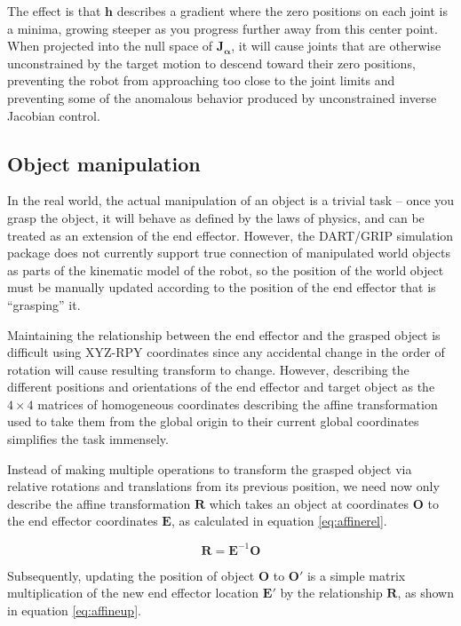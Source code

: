 \documentclass[10pt, conference]{IEEEtran}
\begin{document}
    The effect is that \(\mathbf{h}\) describes a gradient where the
    zero positions on each joint is a minima, growing steeper as you
    progress further away from this center point. When projected into
    the null space of \(\mathbf{J_\alpha}\), it will cause joints that
    are otherwise unconstrained by the target motion to descend toward
    their zero positions, preventing the robot from approaching too
    close to the joint limits and preventing some of the anomalous
    behavior produced by unconstrained inverse Jacobian control.
\subsection{Object manipulation}
\label{sec-3-5}

   In the real world, the actual manipulation of an object is a trivial
   task -- once you grasp the object, it will behave as defined by the
   laws of physics, and can be treated as an extension of the end
   effector. However, the DART/GRIP simulation package does not
   currently support true connection of manipulated world objects as
   parts of the kinematic model of the robot, so the position of the
   world object must be manually updated according to the position of
   the end effector that is ``grasping'' it.

   Maintaining the relationship between the end effector and the grasped
   object is difficult using XYZ-RPY coordinates since any accidental
   change in the order of rotation will cause resulting transform to
   change. However, describing the different positions and orientations
   of the end effector and target object as the \(4 \times 4\) matrices
   of homogeneous coordinates describing the affine transformation used
   to take them from the global origin to their current global
   coordinates simplifies the task immensely.

   Instead of making multiple operations to transform the grasped object
   via relative rotations and translations from its previous position,
   we need now only describe the affine transformation \(\mathbf{R}\)
   which takes an object at coordinates \(\mathbf{O}\) to the end
   effector coordinates \(\mathbf{E}\), as calculated in equation
   \ref{eq:affinerel}.

   \begin{equation}\label{eq:affinerel}
   \mathbf{R} = \mathbf{E}^{-1}\mathbf{O}
   \end{equation}

   Subsequently, updating the position of object \(\mathbf{O}\) to
   \(\mathbf{O'}\) is a simple matrix multiplication of the new end
   effector location \(\mathbf{E'}\) by the relationship \(\mathbf{R}\),
   as shown in equation \ref{eq:affineup}.
\end{document}
